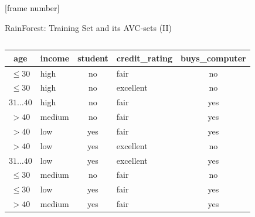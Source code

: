 \documentclass[aspectratio=169,t,table]{beamer}
\begin{document}
  {
    [frame number]
    \begin{frame}{RainForest: Training Set and its AVC-sets (II)}
      \begin{columns}
        \begin{column}{0.6\textwidth}
          \begin{tabular}{|c|l|c|l|c|}
            \hline
            \cellcolor{blue!20}age & \cellcolor{blue!20}income & \cellcolor{blue!20}student & \cellcolor{blue!20}credit\_rating & \cellcolor{brown!20}buys\_computer \\\hline
            \cellcolor{yellow!20}$\leq30$ & \cellcolor{yellow!20}high & \cellcolor{yellow!20}no & \cellcolor{yellow!20}fair & \cellcolor{red!20}no \\\hline
            \cellcolor{yellow!20}$\leq30$ & \cellcolor{yellow!20}high & \cellcolor{yellow!20}no & \cellcolor{yellow!20}excellent & \cellcolor{red!20}no \\\hline
            \cellcolor{yellow!20}$31\ldots40$ & \cellcolor{yellow!20}high & \cellcolor{yellow!20}no & \cellcolor{yellow!20}fair & \cellcolor{green!20}yes \\\hline
            \cellcolor{yellow!20}$>40$ & \cellcolor{yellow!20}medium & \cellcolor{yellow!20}no & \cellcolor{yellow!20}fair & \cellcolor{green!20}yes \\\hline
            \cellcolor{yellow!20}$>40$ & \cellcolor{yellow!20}low & \cellcolor{yellow!20}yes & \cellcolor{yellow!20}fair & \cellcolor{green!20}yes \\\hline
            \cellcolor{yellow!20}$>40$ & \cellcolor{yellow!20}low & \cellcolor{yellow!20}yes & \cellcolor{yellow!20}excellent & \cellcolor{red!20}no \\\hline
            \cellcolor{yellow!20}$31\ldots40$ & \cellcolor{yellow!20}low & \cellcolor{yellow!20}yes & \cellcolor{yellow!20}excellent & \cellcolor{green!20}yes \\\hline
            \cellcolor{yellow!20}$\leq30$ & \cellcolor{yellow!20}medium & \cellcolor{yellow!20}no & \cellcolor{yellow!20}fair & \cellcolor{red!20}no \\\hline
            \cellcolor{yellow!20}$\leq30$ & \cellcolor{yellow!20}low & \cellcolor{yellow!20}yes & \cellcolor{yellow!20}fair & \cellcolor{green!20}yes \\\hline
            \cellcolor{yellow!20}$>40$ & \cellcolor{yellow!20}medium & \cellcolor{yellow!20}yes & \cellcolor{yellow!20}fair & \cellcolor{green!20}yes \\\hline

\end{tabular}
\end{column}
\end{columns}
\end{frame}}
\end{document}
